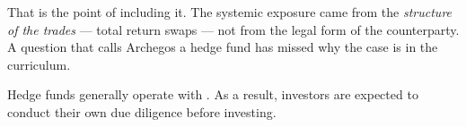 \begin{imtrapbox}[breakable=false,title={Archegos was not a hedge fund}]
That is the point of including it. The systemic exposure came from the
\emph{structure of the trades} --- total return swaps --- not from the legal form
of the counterparty. A question that calls Archegos a hedge fund has missed why
the case is in the curriculum.
\end{imtrapbox}



Hedge funds generally operate with . As a result, investors are expected to conduct their own due diligence
before investing.


